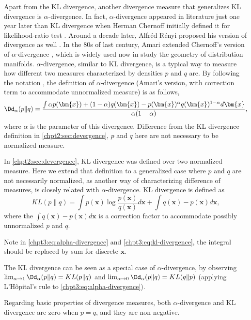 Apart from the KL divergence, another divergence measure that generalizes KL divergence is $\alpha$-divergence. In fact, $\alpha$-divergence appeared in literature just one year later than KL divergence when Herman Chernoff initially defined it for likelihood-ratio test \cite{Chernoff1952measure}. Around a decade later, Alfr\'ed R\'enyi proposed his version of divergence as well \cite{renyi1961entropy}. In the 80s of last century, Amari extended Chernoff's version of $\alpha$-divergence \cite{amari1982differential}, which is widely used now in study the geometry of distribution manifolds. 
$\alpha$-divergence, similar to KL divergence, is a typical way to measure how different two measures characterized by densities $p$ and $q$ are. By following the notation \cite{Zhu95informationgeometric}, the definition of $\alpha$-divergence (Amari's version, with correction term to accommodate unnormalized measure) is as follows,
\begin{equation}\label{chpt3:eq:alpha-divergence}
  \Dd_{\alpha}(p \| q ) = \frac{\int \alpha p(\bm{x}) + (1-\alpha) q (\bm{x}) - p(\bm{x})^{\alpha} q(\bm{x})^{1-\alpha} d\bm{x}}{\alpha(1-\alpha)},
\end{equation}
where $\alpha$ is the parameter of this divergence. Difference from the KL divergence definition in \autoref{chpt2:sec:devergence}, $p$ and $q$ here are not necessary to be normalized measure.

In \autoref{chpt2:sec:devergence}, KL divergence was defined over two normalized measure. Here we extend that definition to a generalized case where $p$ and $q$ are not necessarily normalized, as another way of characterizing difference of measures, is closely related with $\alpha$-divergence. KL divergence is defined as
\begin{equation}\label{chpt3:eq:kl-divergence}
  KL(p \| q) = \int p(\bm{x}) \log{\frac{p(\bm{x})}{q(\bm{x})}} d \bm{x}+ \int q(\bm{x}) - p(\bm{x}) d\bm{x},
\end{equation}
where the $\int q(\bm{x}) - p(\bm{x}) d\bm{x}$ is a correction factor to accommodate possibly unnormalized $p$ and $q$.
\begin{remark}
  Note in \eqref{chpt3:eq:alpha-divergence} and \eqref{chpt3:eq:kl-divergence}, the integral should be replaced by sum for discrete $\bm{x}$.
\end{remark}
\begin{remark}
  The KL divergence can be seen as a special case of $\alpha$-divergence, by observing $\lim_{\alpha \rightarrow 1}\Dd_{\alpha}(p \| q ) = KL(p\|q)$ and $\lim_{\alpha \rightarrow 0}\Dd_{\alpha}(p \| q ) = KL(q\|p)$ (applying L'H\^opital's rule to \eqref{chpt3:eq:alpha-divergence}).

  Regarding basic properties of divergence measures, both $\alpha$-divergence and KL divergence are zero when $p=q$, and they are non-negative. 
\end{remark}

